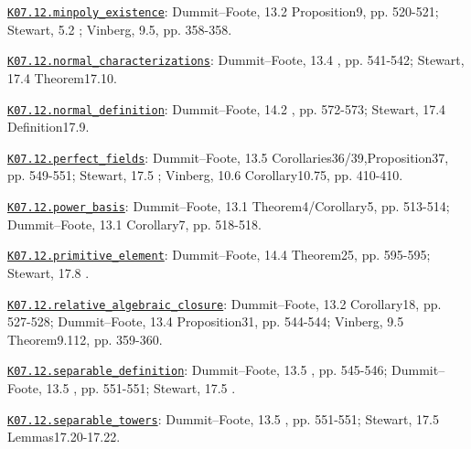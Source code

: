 \par\smallskip\noindent\hypertarget{src:K07.12.minpoly_existence}{}\label{src:K07.12.minpoly_existence}\hyperref[K07.12.minpoly_existence]{\texttt{K07.12.minpoly\_existence}}: Dummit--Foote, 13.2 Proposition9, pp. 520-521; Stewart, 5.2 ; Vinberg, 9.5, pp. 358-358.
\par\smallskip\noindent\hypertarget{src:K07.12.normal_characterizations}{}\label{src:K07.12.normal_characterizations}\hyperref[K07.12.normal_characterizations]{\texttt{K07.12.normal\_characterizations}}: Dummit--Foote, 13.4 , pp. 541-542; Stewart, 17.4 Theorem17.10.
\par\smallskip\noindent\hypertarget{src:K07.12.normal_definition}{}\label{src:K07.12.normal_definition}\hyperref[K07.12.normal_definition]{\texttt{K07.12.normal\_definition}}: Dummit--Foote, 14.2 , pp. 572-573; Stewart, 17.4 Definition17.9.
\par\smallskip\noindent\hypertarget{src:K07.12.perfect_fields}{}\label{src:K07.12.perfect_fields}\hyperref[K07.12.perfect_fields]{\texttt{K07.12.perfect\_fields}}: Dummit--Foote, 13.5 Corollaries36/39,Proposition37, pp. 549-551; Stewart, 17.5 ; Vinberg, 10.6 Corollary10.75, pp. 410-410.
\par\smallskip\noindent\hypertarget{src:K07.12.power_basis}{}\label{src:K07.12.power_basis}\hyperref[K07.12.power_basis]{\texttt{K07.12.power\_basis}}: Dummit--Foote, 13.1 Theorem4/Corollary5, pp. 513-514; Dummit--Foote, 13.1 Corollary7, pp. 518-518.
\par\smallskip\noindent\hypertarget{src:K07.12.primitive_element}{}\label{src:K07.12.primitive_element}\hyperref[K07.12.primitive_element]{\texttt{K07.12.primitive\_element}}: Dummit--Foote, 14.4 Theorem25, pp. 595-595; Stewart, 17.8 .
\par\smallskip\noindent\hypertarget{src:K07.12.relative_algebraic_closure}{}\label{src:K07.12.relative_algebraic_closure}\hyperref[K07.12.relative_algebraic_closure]{\texttt{K07.12.relative\_algebraic\_closure}}: Dummit--Foote, 13.2 Corollary18, pp. 527-528; Dummit--Foote, 13.4 Proposition31, pp. 544-544; Vinberg, 9.5 Theorem9.112, pp. 359-360.
\par\smallskip\noindent\hypertarget{src:K07.12.separable_definition}{}\label{src:K07.12.separable_definition}\hyperref[K07.12.separable_definition]{\texttt{K07.12.separable\_definition}}: Dummit--Foote, 13.5 , pp. 545-546; Dummit--Foote, 13.5 , pp. 551-551; Stewart, 17.5 .
\par\smallskip\noindent\hypertarget{src:K07.12.separable_towers}{}\label{src:K07.12.separable_towers}\hyperref[K07.12.separable_towers]{\texttt{K07.12.separable\_towers}}: Dummit--Foote, 13.5 , pp. 551-551; Stewart, 17.5 Lemmas17.20-17.22.
